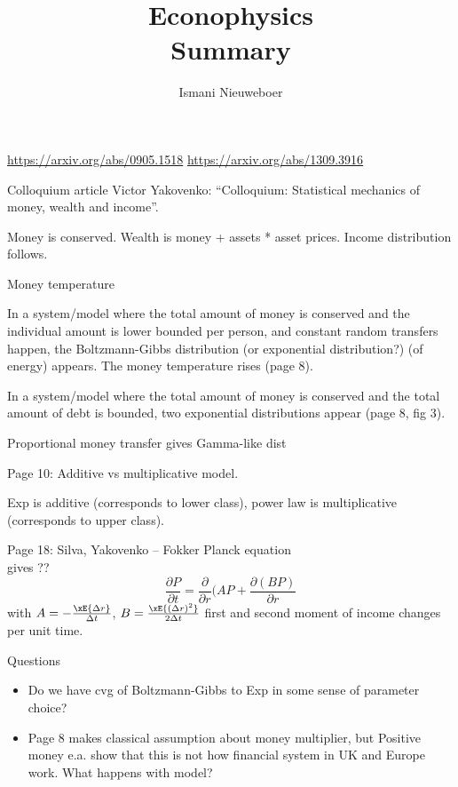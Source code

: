 \documentclass{article}
\title{Econophysics\\
\normalsize{Summary}
}
\author{Ismani Nieuweboer}
\begin{document}
\maketitle

\url{https://arxiv.org/abs/0905.1518}
\url{https://arxiv.org/abs/1309.3916}

Colloquium article Victor Yakovenko: ``Colloquium: Statistical mechanics of money, wealth and income''.

Money is conserved. Wealth is money + assets * asset prices. Income distribution follows.

Money temperature

In a system/model where the total amount of money is conserved and the individual amount is lower bounded per person, and constant random transfers happen, the Boltzmann-Gibbs distribution (or exponential distribution?) (of energy) appears. The money temperature rises (page 8).

In a system/model where the total amount of money is conserved and the total amount of debt is bounded, two exponential distributions appear (page 8, fig 3).

Proportional money transfer gives Gamma-like dist

Page 10: Additive vs multiplicative model.

Exp is additive (corresponds to lower class), power law is multiplicative (corresponds to upper class).

Page 18: Silva, Yakovenko -- Fokker Planck equation
\[
\]
gives ??
\[
\frac{\partial P}{\partial t}
= \frac{\partial}{ \partial r} (AP + \frac{\partial (BP)}{ \partial r}
\]
with $A = - \frac{\xE{\Delta r}}{\Delta t}$, $B = \frac{\xE{(\Delta r)^2}}{2 \Delta t}$ %
first and second moment of income changes per unit time.

Questions
\begin{itemize}
    \item Do we have cvg of Boltzmann-Gibbs to Exp in some sense of parameter choice?
    \item Page 8 makes classical assumption about money multiplier, but Positive money e.a. show that this is not how financial system in UK and Europe work. What happens with model?
\end{itemize}
\end{document}
